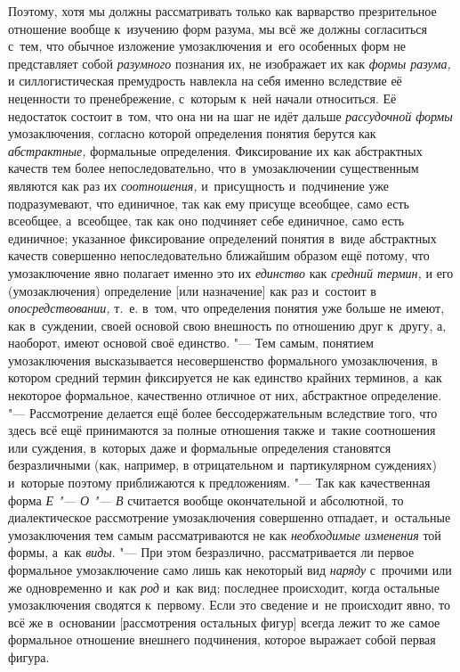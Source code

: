 Поэтому, хотя мы должны рассматривать только как варварство
презрительное отношение вообще к~изучению форм разума, мы всё же должны
согласиться с~тем, что обычное изложение умозаключения и~его особенных форм
не представляет собой {\em разумного}
познания их, не изображает их как
{\em формы разума,} и
силлогистическая премудрость навлекла на себя именно вследствие её
неценности то пренебрежение, с~которым к~ней начали относиться. Её
недостаток состоит в~том, что она ни на шаг не идёт дальше
{\em рассудочной формы}
умозаключения, согласно которой определения понятия берутся
как {\em абстрактные,}
формальные определения. Фиксирование их как абстрактных
качеств тем более непоследовательно, что в~умозаключении существенным
являются как раз их {\em соотношения,}
и~присущность и~подчинение уже подразумевают, что единичное,
так как ему присуще всеобщее, само есть всеобщее, а~всеобщее, так как оно
подчиняет себе единичное, само есть единичное; указанное фиксирование
определений понятия в~виде абстрактных качеств совершенно непоследовательно
ближайшим образом ещё потому, что умозаключение явно полагает именно это их
{\em единство} как
{\em средний термин,} и
его (умозаключения) определение [или назначение] как раз и~состоит в
{\em опосредствовании,}
т.~е. в~том, что определения понятия уже больше не имеют, как
в~суждении, своей основой свою внешность по отношению друг к~другу, а,
наоборот, имеют основой своё единство. "--- Тем самым, понятием
умозаключения высказывается несовершенство формального умозаключения, в
котором средний термин фиксируется не как единство крайних терминов, а~как
некоторое формальное, качественно отличное от них, абстрактное
определение. "--- Рассмотрение делается ещё более
бессодержательным вследствие того, что здесь всё ещё принимаются за полные
отношения также и~такие соотношения или суждения, в~которых даже и
формальные определения становятся безразличными (как, например, в
отрицательном и~партикулярном суждениях) и~которые поэтому приближаются к
предложениям. "--- Так как качественная форма
{\em Е "--- О "--- В} считается вообще окончательной и
абсолютной, то диалектическое рассмотрение умозаключения совершенно
отпадает, и~остальные умозаключения тем самым рассматриваются не как
{\em необходимые изменения}
той формы, а~как
{\em виды}. "--- При этом
безразлично, рассматривается ли первое формальное умозаключение само лишь
как некоторый вид {\em наряду}
с~прочими или же одновременно и~как
{\em род} и~как вид;
последнее происходит, когда остальные умозаключения сводятся к~первому.
Если это сведение и~не происходит явно, то всё же в~основании [рассмотрения
остальных фигур] всегда лежит то же самое формальное отношение внешнего
подчинения, которое выражает собой первая фигура.

